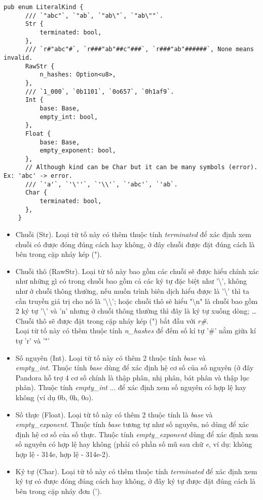 \begin{itemize}
    \begin{lstlisting}[]
    pub enum LiteralKind {
      /// `"abc"`, `"ab`, `"ab\"`, `"ab\""`.
      Str {
          terminated: bool,
      },
      /// `r#"abc"#`, `r###"ab"##c"###`, `r###"ab"######`, None means invalid.
      RawStr {
          n_hashes: Option<u8>,
      },
      /// `1_000`, `0b1101`, `0o657`, `0h1af9`.
      Int {
          base: Base,
          empty_int: bool,
      },
      Float {
          base: Base,
          empty_exponent: bool,
      },
      // Although kind can be Char but it can be many symbols (error). Ex: 'abc' -> error.
      /// `'a'`, `'\''`, `'\\'`, `'abc'`, `'ab`.
      Char {
          terminated: bool,
      },
    }
    \end{lstlisting}
    \begin{itemize}
      \item Chuỗi (Str). Loại từ tố này có thêm thuộc tính \textit{terminated} để xác định xem chuỗi có được đóng đúng cách hay không, ở đây chuỗi được đặt đúng cách là bên trong cặp nháy kép (").
      \item Chuỗi thô (RawStr). Loại từ tố này bao gồm các chuỗi sẽ được hiểu chính xác như những gì có trong chuỗi bao gồm cả các ký tự đặc biệt như '\textbackslash', không như ở chuỗi thông thường, nếu muốn trình biên dịch hiểu được là '\textbackslash' thì ta cần truyền giá trị cho nó là '\textbackslash\textbackslash'; hoặc chuỗi thô sẽ hiểu "\textbackslash n" là chuỗi bao gồm 2 ký tự '\textbackslash' và 'n' nhưng ở chuỗi thông thường thì đây là ký tự xuống dòng; \dots\space Chuỗi thô sẽ được đặt trong cặp nháy kép (") bắt đầu với \textit{r\#}.\\Loại từ tố này có thêm thuộc tính \textit{n\_hashes} để đếm số kí tự '\#' nằm giữa kí tự 'r' và '"'
      \item Số nguyên (Int). Loại từ tố này có thêm 2 thuộc tính \textit{base} và \\\textit{empty\_int}. Thuộc tính \textit{base} dùng để xác định hệ cơ số của số nguyên (ở đây Pandora hỗ trợ 4 cơ số chính là thập phân, nhị phân, bát phân và thập lục phân). Thuộc tính \textit{empty\_int} ... để xác định xem số nguyên có hợp lệ hay không (ví dụ 0b, 0h, 0o).
      \item Số thực (Float). Loại từ tố này có thêm 2 thuộc tính là \textit{base} và \\\textit{empty\_exponent}. Thuộc tính \textit{base} tương tự như số nguyên, nó dùng để xác định hệ cơ số của số thực. Thuộc tính \textit{empty\_exponent} dùng để xác định xem số nguyên có hợp lệ hay không (phải có phần số mũ sau chữ \textit{e}, ví dụ: không hợp lệ - 314e, hợp lệ - 314e-2).
      \item Ký tự (Char). Loại từ tố này có thêm thuộc tính \textit{terminated} để xác định xem ký tự có được đóng đúng cách hay không, ở đây ký tự được đặt đúng cách là bên trong cặp nháy đơn (').
      

\end{itemize}
\end{itemize}
